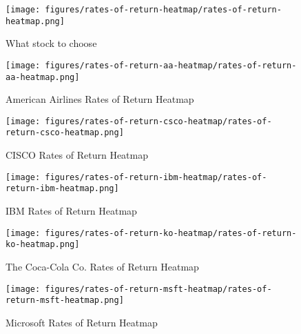 \documentclass[12pt,journal,draftcls,onecolumn]{IEEEtran}
\begin{document}
\begin{figure}[htp]
\caption{What stock to choose}
\label{rates-of-return-heatmap}
\begin{center}
\texttt{[image: figures/rates-of-return-heatmap/rates-of-return-heatmap.png]}
\end{center}
\end{figure}

\begin{figure}[htp]
\caption{American Airlines Rates of Return Heatmap}
\label{aa-ror-heatmap}
\begin{center}
\texttt{[image: figures/rates-of-return-aa-heatmap/rates-of-return-aa-heatmap.png]}
\end{center}
\end{figure}

\begin{figure}[htp]
\caption{CISCO Rates of Return Heatmap}
\label{csco-ror-heatmap}
\begin{center}
\texttt{[image: figures/rates-of-return-csco-heatmap/rates-of-return-csco-heatmap.png]}
\end{center}
\end{figure}

\begin{figure}[htp]
\caption{IBM Rates of Return Heatmap}
\label{ibm-ror-heatmap}
\begin{center}
\texttt{[image: figures/rates-of-return-ibm-heatmap/rates-of-return-ibm-heatmap.png]}
\end{center}
\end{figure}

\begin{figure}[htp]
\caption{The Coca-Cola Co. Rates of Return Heatmap}
\label{ko-ror-heatmap}
\begin{center}
\texttt{[image: figures/rates-of-return-ko-heatmap/rates-of-return-ko-heatmap.png]}
\end{center}
\end{figure}

\begin{figure}[htp]
\caption{Microsoft Rates of Return Heatmap}
\label{msft-ror-heatmap}
\begin{center}
\texttt{[image: figures/rates-of-return-msft-heatmap/rates-of-return-msft-heatmap.png]}
\end{center}
\end{figure}
\end{document}
